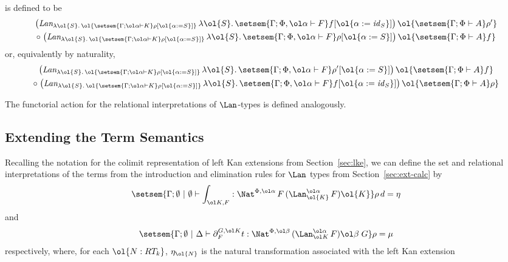 \documentclass{lmcs}
\theoremstyle{plain}\newtheorem{satz}[thm]{Satz}
\renewcommand{\id}{\mathit{id}}
\begin{document}
\noindent
is defined to be 
\begin{multline*}
\big(\textit{Lan}_{\lambda \ol{S}.\,\ol{\setsem{\Gamma; \ol\alpha
      \vdash K}\rho[\ol{\alpha := S}]}}\,  
      \lambda \ol{S}.\,\setsem{\Gamma; \Phi, \ol\alpha \vdash
        F}f[\ol{\alpha := \id_S}]\big)\, 
    \ol{\setsem{\Gamma; \Phi \vdash A}\rho'} \\
\circ\;
  \big(\textit{Lan}_{\lambda \ol{S}.\,\ol{\setsem{\Gamma; \ol\alpha
        \vdash K}\rho[\ol{\alpha := S}]}}\,  
      \lambda \ol{S}.\,\setsem{\Gamma; \Phi, \ol\alpha \vdash
        F}\rho[\ol{\alpha := S}]\big)\, 
    \ol{\setsem{\Gamma; \Phi \vdash A}f}
\end{multline*}
or, equivalently by naturality,
\begin{multline*}
\big(\textit{Lan}_{\lambda \ol{S}.\,\ol{\setsem{\Gamma; \ol\alpha
      \vdash K}\rho[\ol{\alpha := S}]}}\, 
      \lambda \ol{S}.\,\setsem{\Gamma; \Phi, \ol\alpha \vdash
        F}\rho'[\ol{\alpha := S}]\big)\, 
    \ol{\setsem{\Gamma; \Phi \vdash A}f} \\
\circ\;
  \big(\textit{Lan}_{\lambda \ol{S}.\,\ol{\setsem{\Gamma; \ol\alpha
        \vdash K}\rho[\ol{\alpha := S}]}}\, 
     \lambda \ol{S}.\, \setsem{\Gamma; \Phi, \ol\alpha \vdash
       F}f[\ol{\alpha := \id_S}]\big)\, 
    \ol{\setsem{\Gamma; \Phi \vdash A}\rho}
\end{multline*}

\vspace*{0.05in}

\noindent
The functorial action for the relational interpretations of
$\Lan$-types is defined analogously.

\subsection{Extending the Term Semantics}\label{sec:term-sem}

Recalling the notation for the colimit representation of left Kan
extensions from Section~\ref{sec:lke}, we can define the set and
relational interpretations of the terms from the introduction and
elimination rules for $\Lan$ types from Section~\ref{sec:ext-calc} by 
\[
\setsem{\Gamma;\emptyset~|~\emptyset \vdash \int_{\ol K,F}
: \Nat^{\Phi, \ol\alpha}\, F\, (\Lan^{\ol\alpha}_{\ol{K}}\,  F) \ol{K}}\rho\,d
= \eta
\]
and
\[
\setsem{\Gamma;\emptyset~|~\Delta \vdash \partial^{G, \ol K}_F t 
: \Nat^{\Phi, \ol\beta}\, (\Lan^{\ol\alpha}_{\ol K}\,F) \ol \beta\; G}\rho
= \mu
\]
respectively, where, for each $\ol{N : RT_k}$, $\eta_{\ol{N}}$
is the natural transformation associated with the left Kan extension
\end{document}
